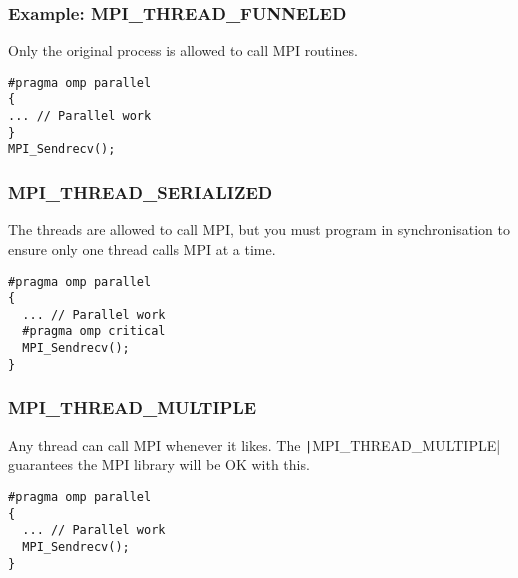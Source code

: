 \documentclass{beamer}
\begin{document}
\begin{frame}[fragile]
\frametitle{Example: MPI\_THREAD\_FUNNELED}
Only the original process is allowed to call MPI routines.
\begin{verbatim}
#pragma omp parallel
{
... // Parallel work
}
MPI_Sendrecv();
\end{verbatim}
\end{frame}

\begin{frame}[fragile]
\frametitle{MPI\_THREAD\_SERIALIZED}
The threads are allowed to call MPI, but you must program in synchronisation to ensure only one thread calls MPI at a time.
\begin{verbatim}
#pragma omp parallel
{
  ... // Parallel work
  #pragma omp critical
  MPI_Sendrecv();
}
\end{verbatim}
\end{frame}

\begin{frame}[fragile]
\frametitle{MPI\_THREAD\_MULTIPLE}
Any thread can call MPI whenever it likes. The \texttt|MPI_THREAD_MULTIPLE| guarantees the MPI library will be OK with this.
\begin{verbatim}
#pragma omp parallel
{
  ... // Parallel work
  MPI_Sendrecv();
}
\end{verbatim}
\end{frame}

\end{document}
